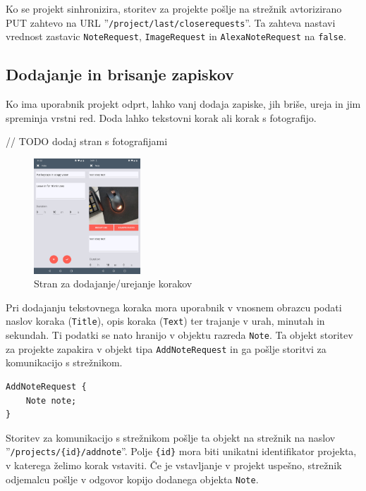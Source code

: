 \documentclass[a4paper, 12pt]{book}
\begin{document}
Ko se projekt sinhronizira, storitev za projekte pošlje na strežnik avtorizirano PUT zahtevo na URL ''\texttt{/project/last/closerequests}''.
Ta zahteva nastavi vrednost zastavic \texttt{NoteRequest}, \texttt{ImageRequest} in \texttt{AlexaNoteRequest} na \texttt{false}.


\subsection{Dodajanje in brisanje zapiskov}

Ko ima uporabnik projekt odprt, lahko vanj dodaja zapiske, jih briše, ureja in jim spreminja vrstni red.
Doda lahko tekstovni korak ali korak s fotografijo.

// TODO dodaj stran s fotografijami

\begin{figure}[H]
\begin{center}
	\includegraphics[width=4cm]{app_note_image}
\end{center}
	\caption{Stran za dodajanje/urejanje korakov}
\label{app_note}
\end{figure}

Pri dodajanju tekstovnega koraka mora uporabnik v vnosnem obrazcu podati naslov koraka (\texttt{Title}), opis koraka (\texttt{Text}) ter trajanje v urah, minutah in sekundah.
Ti podatki se nato hranijo v objektu razreda \texttt{Note}.
Ta objekt storitev za projekte zapakira v objekt tipa \texttt{AddNoteRequest} in ga pošlje storitvi za komunikacijo s strežnikom.

\begin{Verbatim}[commandchars=+\[\]]
AddNoteRequest { 
    Note note; 
}
\end{Verbatim}

Storitev za komunikacijo s strežnikom pošlje ta objekt na strežnik na naslov ''\texttt{/projects/\{id\}/addnote}''.
Polje \texttt{\{id\}} mora biti unikatni identifikator projekta, v katerega želimo korak vstaviti.
Če je vstavljanje v projekt uspešno, strežnik odjemalcu pošlje v odgovor kopijo dodanega objekta \texttt{Note}.
\end{document}
